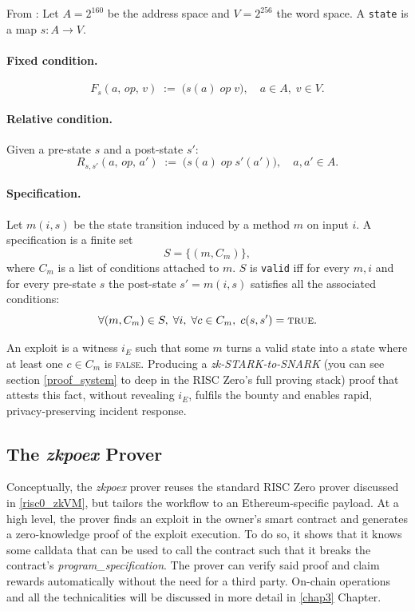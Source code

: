 From \cite{zkpoex_docs}: Let \(A = 2^{160}\) be the address space and \(V = 2^{256}\) the word space.
A \texttt{state} is a map \(s: A \rightarrow V\).

\paragraph{Fixed condition.}
\[
F_{s}(a,\,op,\,v)\;:=\;
\bigl(s(a)\;\text{\(op\)}\;v\bigr),\quad
a\in A,\;v\in V .
\]

\paragraph{Relative condition.}
Given a pre-state \(s\) and a post-state \(s'\):
\[
R_{s,s'}(a,\,op,\,a')\;:=\;
\bigl(s(a)\;\text{\(op\)}\;s'(a')\bigr),
\quad a,a'\in A .
\]

\paragraph{Specification.}
Let \(m(i, s)\) be the state transition induced by a method \(m\) on input
\(i\).  
A specification is a finite set
\[
S=\{(m, C_m)\},
\]
where \(C_m\) is a list of conditions attached to \(m\).
\(S\) is \texttt{valid} iff for every \(m,i\) and for every pre-state \(s\) the
post-state \(s'=m(i,s)\) satisfies all the associated conditions:
\[
\forall (m, C_m)\in S,\;\forall i,\;
\forall c\in C_m,\; c(s,s') = \textsc{true}.
\]

An exploit is a witness \(i_E\) such that some \(m\) turns a valid state into a
state where at least one \(c\in C_m\) is \textsc{false}.  
Producing a \textit{zk-STARK-to-SNARK} (you can see section \ref{proof_system} to deep in the RISC Zero's full proving stack) proof that attests this fact, without revealing \(i_E\), fulfils the bounty and enables rapid, privacy-preserving incident response.


\subsection{The \textit{zkpoex} Prover}\makeatletter{}\makeatother
\label{zkpoex_prover}

Conceptually, the \textit{zkpoex} prover reuses the standard RISC Zero prover discussed in \ref{risc0_zkVM}, but tailors the workflow to an Ethereum-specific payload. At a high level, the prover finds an exploit in the owner's smart contract and generates a zero-knowledge proof of the exploit execution. To do so, it shows that it knows some calldata that can be used to call the contract such that it breaks the contract's \textit{program\_specification}. The prover can verify said proof and claim rewards automatically without the need for a third party. On-chain operations and all the technicalities will be discussed in more detail in \ref{chap3} Chapter.

